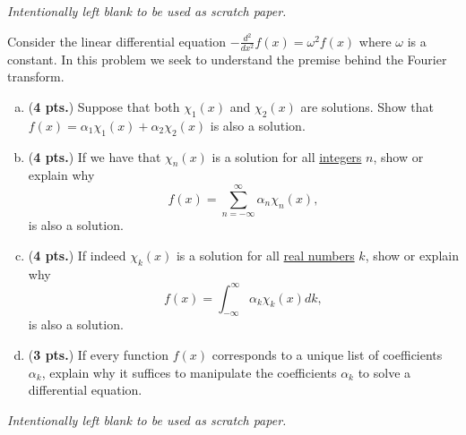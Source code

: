 \documentclass[12pt]{amsbook}
\begin{document}
\newpage
\emph{Intentionally left blank to be used as scratch paper.}\\


\newpage
\begin{problem} Consider the linear differential equation $-\frac{d^2}{dx^2}f(x)=\omega^2f(x)$ where $\omega$ is a constant. In this problem we seek to understand the premise behind the Fourier transform.
\begin{enumerate}[(a)]
	\item	(\textbf{4 pts.}) Suppose that both $\chi_1(x)$ and $\chi_2(x)$ are solutions. Show that $f(x)=\alpha_1 \chi_1(x)+ \alpha_2 \chi_2(x)$ is also a solution.
	\vspace*{4cm}
	
	\item	(\textbf{4 pts.}) If we have that $\chi_n(x)$ is a solution for all \underline{integers} $n$, show or explain why 
	\[
	f(x) = \sum_{n=-\infty}^\infty  \alpha_n \chi_n(x),
	\]
	is also a solution.
	\vspace*{4cm}
	
	\item	(\textbf{4 pts.}) If indeed $\chi_k(x)$ is a solution for all \underline{real numbers} $k$, show or explain why 
	\[
	f(x) = \int_{-\infty}^\infty \alpha_k \chi_k(x) dk,
	\]
	is also a solution.
	\vspace*{4cm}
	
	\item	(\textbf{3 pts.}) If every function $f(x)$ corresponds to a unique list of coefficients $\alpha_k$, explain why it suffices to manipulate the coefficients $\alpha_k$ to solve a differential equation.
	
\end{enumerate}
\end{problem}

\newpage
\emph{Intentionally left blank to be used as scratch paper.}\\
\end{document}
